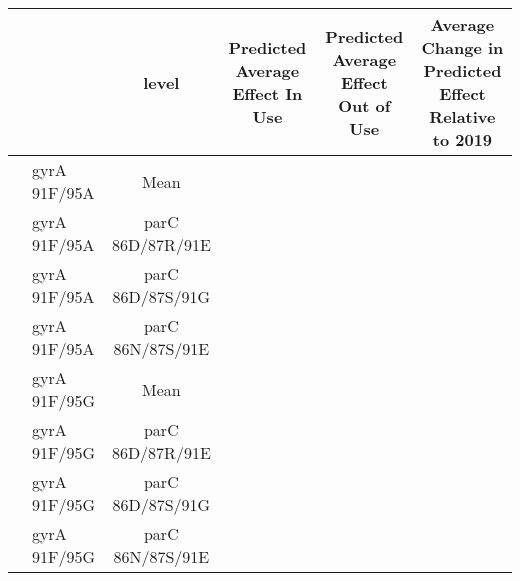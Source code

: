 \begingroup
\fontsize{5.2pt}{6.3pt}\selectfont
\begin{longtable}{l|l|cccc}
\toprule
\multicolumn{2}{c}{} & level & Predicted Average Effect In Use & Predicted Average Effect Out of Use & Average Change in Predicted Effect Relative to 2019 \\ 
\midrule\addlinespace[2.5pt]
\multirow{8}{=}{gyrA} & gyrA 91F/95A & Mean & {\cellcolor[HTML]{808080}{\textcolor[HTML]{FFFFFF}{0.24 (-0.53, 0.98)}}} & {\cellcolor[HTML]{808080}{\textcolor[HTML]{FFFFFF}{0.35 (-0.35, 0.96)}}} & {\cellcolor[HTML]{808080}{\textcolor[HTML]{FFFFFF}{-0.12 (-0.53, 0.32)}}} \\ 
 & gyrA 91F/95A & parC 86D/87R/91E & {\cellcolor[HTML]{808080}{\textcolor[HTML]{FFFFFF}{0.40 (-0.31, 1.13)}}} & {\cellcolor[HTML]{FDE725}{\textcolor[HTML]{000000}{0.52 (0.23, 0.79)}}} & {\cellcolor[HTML]{808080}{\textcolor[HTML]{FFFFFF}{-0.13 (-0.79, 0.55)}}} \\ 
 & gyrA 91F/95A & parC 86D/87S/91G & {\cellcolor[HTML]{808080}{\textcolor[HTML]{FFFFFF}{0.24 (-1.08, 1.54)}}} & {\cellcolor[HTML]{808080}{\textcolor[HTML]{FFFFFF}{0.36 (-0.87, 1.45)}}} & {\cellcolor[HTML]{808080}{\textcolor[HTML]{FFFFFF}{-0.12 (-0.75, 0.56)}}} \\ 
 & gyrA 91F/95A & parC 86N/87S/91E & {\cellcolor[HTML]{808080}{\textcolor[HTML]{FFFFFF}{0.09 (-0.24, 0.43)}}} & {\cellcolor[HTML]{440154}{\textcolor[HTML]{FFFFFF}{0.24 (0.01, 0.48)}}} & {\cellcolor[HTML]{808080}{\textcolor[HTML]{FFFFFF}{-0.15 (-0.49, 0.18)}}} \\ 
 & gyrA 91F/95G & Mean & {\cellcolor[HTML]{808080}{\textcolor[HTML]{FFFFFF}{0.13 (-0.54, 0.99)}}} & {\cellcolor[HTML]{808080}{\textcolor[HTML]{FFFFFF}{-0.20 (-0.78, 0.62)}}} & {\cellcolor[HTML]{808080}{\textcolor[HTML]{FFFFFF}{0.34 (-0.07, 0.66)}}} \\ 
 & gyrA 91F/95G & parC 86D/87R/91E & {\cellcolor[HTML]{808080}{\textcolor[HTML]{FFFFFF}{0.10 (-0.13, 0.30)}}} & {\cellcolor[HTML]{440154}{\textcolor[HTML]{FFFFFF}{-0.26 (-0.47, -0.05)}}} & {\cellcolor[HTML]{FDE725}{\textcolor[HTML]{000000}{0.37 (0.16, 0.57)}}} \\ 
 & gyrA 91F/95G & parC 86D/87S/91G & {\cellcolor[HTML]{808080}{\textcolor[HTML]{FFFFFF}{0.18 (-0.86, 1.36)}}} & {\cellcolor[HTML]{808080}{\textcolor[HTML]{FFFFFF}{-0.19 (-1.05, 0.92)}}} & {\cellcolor[HTML]{808080}{\textcolor[HTML]{FFFFFF}{0.37 (-0.18, 0.98)}}} \\ 
 & gyrA 91F/95G & parC 86N/87S/91E & {\cellcolor[HTML]{808080}{\textcolor[HTML]{FFFFFF}{0.19 (-0.77, 1.35)}}} & {\cellcolor[HTML]{808080}{\textcolor[HTML]{FFFFFF}{-0.17 (-1.05, 0.89)}}} & {\cellcolor[HTML]{808080}{\textcolor[HTML]{FFFFFF}{0.37 (-0.07, 0.93)}}} \\ 

\end{longtable}
